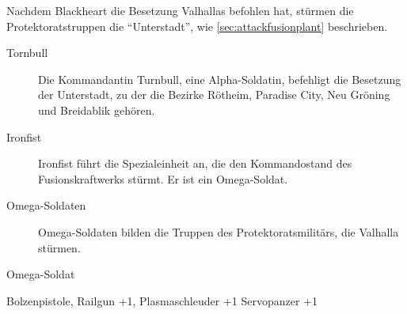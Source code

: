 
Nachdem Blackheart die Besetzung Valhallas befohlen hat, stürmen die Protektoratstruppen die ``Unterstadt'', wie \cref{sec:attackfusionplant} beschrieben.

\begin{description}
    \item[Tornbull] Die Kommandantin Turnbull, eine Alpha-Soldatin, befehligt die Besetzung der Unterstadt, zu der die Bezirke Rötheim, Paradise City, Neu Gröning und Breidablik gehören.
    \item[Ironfist] Ironfist führt die Spezialeinheit an, die den Kommandostand des Fusionskraftwerks stürmt. Er ist ein Omega-Soldat.
    \item[Omega-Soldaten] Omega-Soldaten bilden die Truppen des Protektoratsmilitärs, die Valhalla stürmen.
\end{description}

\begin{nscsheet}{Omega-Soldat}
    \nscstats[ATT=3,AGG=2,CON=2]
    \nscruler
    \begin{nscinventory}
        \nscitem[Waffen] Bolzenpistole, Railgun +1, Plasmaschleuder +1
        \nscitem[Rüstung] Servopanzer +1
    \end{nscinventory}
\end{nscsheet}
